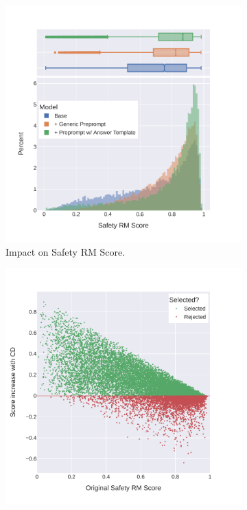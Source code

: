 \begin{figure}[!htbp]
    \centering
    \begin{subfigure}{.5\textwidth}
        \centering
        \includegraphics[width=\textwidth]{img/context_distillation_with_templates_distribution.pdf}
        \caption{Impact on Safety RM Score.}
        \label{fig:context_distillation_with_templates_distribution}
    \end{subfigure}%
    \begin{subfigure}{.5\textwidth}
        \centering
        \includegraphics[width=\textwidth]{img/context_distillation_with_templates_delta_scatter_plot.pdf}

\end{subfigure}
\end{figure}
